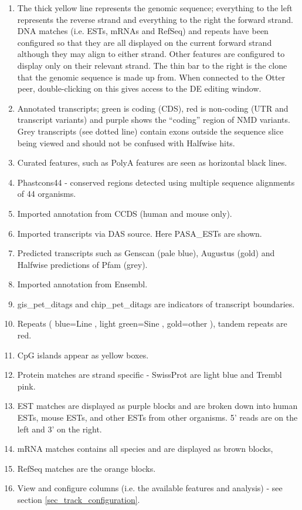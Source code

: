 \documentclass[letterpaper]{article}
\begin{document}
\begin{enumerate}
\item The thick yellow line represents the genomic sequence; everything to the left represents the reverse strand and everything to the right the forward strand. DNA matches (i.e. ESTs, mRNAs and RefSeq) and repeats have been configured so that they are all displayed on the current forward strand although they may align to either strand. Other features are configured to display only on their relevant strand. The thin bar to the right is the clone that the genomic sequence is made up from. When connected to the Otter peer, double-clicking on this gives access to the DE editing window.
\item Annotated transcripts; green is coding (CDS), red is non-coding (UTR and transcript variants) and purple shows the ``coding'' region of NMD variants. Grey transcripts (see dotted line) contain exons outside the sequence slice being viewed and should not be confused with Halfwise hits.
\item Curated features, such as PolyA features are seen as horizontal black lines.
\item Phastcons44 - conserved regions detected using multiple sequence alignments of 44 organisms.
\item Imported annotation from CCDS (human and mouse only).
\item Imported transcripts via DAS source. Here PASA\_ESTs are shown.
\item Predicted transcripts such as Genscan (pale blue), Augustus (gold) and Halfwise predictions of Pfam (grey).
\item Imported annotation from Ensembl.
\item gis\_pet\_ditags and chip\_pet\_ditags are indicators of transcript boundaries.
\item Repeats ( blue=Line , light green=Sine , gold=other ), tandem repeats are red.
\item CpG islands appear as yellow boxes.
\item Protein matches are strand specific - SwissProt are light blue and Trembl pink.
\item EST matches are displayed as purple blocks and are broken down into human ESTs, mouse ESTs, and other ESTs from other organisms. 5' reads are on the left and 3' on the right.
\item mRNA matches contains all species and are displayed as brown blocks,
\item RefSeq matches are the orange blocks.
\item View and configure columns (i.e. the available features and analysis) - see section \ref{sec_track_configuration}.
\end{enumerate}
\end{document}
